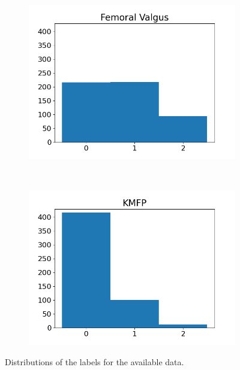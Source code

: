 \begin{figure}
\begin{subfigure}[t]{0.4\textwidth}
    \includegraphics[width=\textwidth]{files/figs/met/femval-label-hist.png}
    \caption{}
    \label{fig:femval-labels}
  \end{subfigure}
  ~
  \begin{subfigure}[t]{0.4\textwidth}
    \includegraphics[width=\textwidth]{files/figs/met/kmfp-label-hist.png}
    \caption{}
    \label{fig:kmfp-labels}
  \end{subfigure}

  \caption{Distributions of the labels for the available data.}
  \label{fig:label-dist}
\end{figure}


